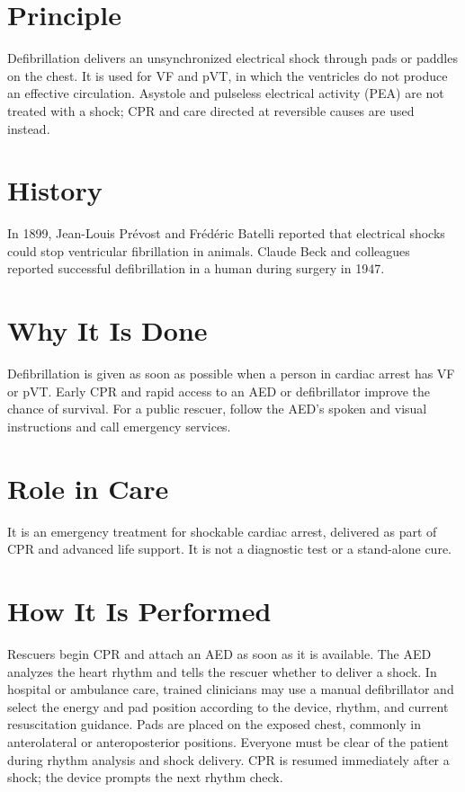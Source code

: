 \section*{Principle}
Defibrillation delivers an unsynchronized electrical shock through pads or paddles on the chest. It is used for VF and pVT, in which the ventricles do not produce an effective circulation. Asystole and pulseless electrical activity (PEA) are not treated with a shock; CPR and care directed at reversible causes are used instead.

\section*{History}
In 1899, Jean-Louis Prévost and Frédéric Batelli reported that electrical shocks could stop ventricular fibrillation in animals. Claude Beck and colleagues reported successful defibrillation in a human during surgery in 1947.

\section*{Why It Is Done}
Defibrillation is given as soon as possible when a person in cardiac arrest has VF or pVT. Early CPR and rapid access to an AED or defibrillator improve the chance of survival. For a public rescuer, follow the AED's spoken and visual instructions and call emergency services.

\section*{Role in Care}
It is an emergency treatment for shockable cardiac arrest, delivered as part of CPR and advanced life support. It is not a diagnostic test or a stand-alone cure.

\section*{How It Is Performed}
Rescuers begin CPR and attach an AED as soon as it is available. The AED analyzes the heart rhythm and tells the rescuer whether to deliver a shock. In hospital or ambulance care, trained clinicians may use a manual defibrillator and select the energy and pad position according to the device, rhythm, and current resuscitation guidance. Pads are placed on the exposed chest, commonly in anterolateral or anteroposterior positions. Everyone must be clear of the patient during rhythm analysis and shock delivery. CPR is resumed immediately after a shock; the device prompts the next rhythm check.

